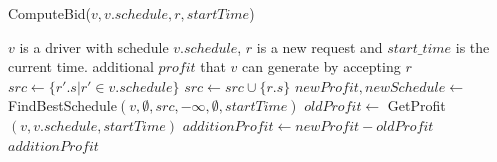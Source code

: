 %


\begin{algorithm}[!h]
	\caption{ComputeBid($v, v.schedule, r, startTime$)}
	\label{algo:comp_bid}
	\begin{algorithmic}[1]
		\REQUIRE $v$ is a driver with schedule $v.schedule$, $r$ is a new request and $start\_time$ is the current time.
		\ENSURE additional $profit$ that $v$ can generate by accepting $r$
		\STATE $src \leftarrow \lbrace r'.s | r' \in v.schedule \rbrace$ 
		\STATE $src \leftarrow src \cup \{r.s\}$
		\STATE \small{$newProfit, newSchedule \leftarrow $FindBestSchedule$(v, \emptyset, src, -\infty, \emptyset,  startTime)$} \label{ln:fbs}
		\STATE $oldProfit\leftarrow $ GetProfit$(v, v.schedule, startTime)$ \label{ln:gps}
		\STATE $additionProfit \leftarrow newProfit - oldProfit$
		\RETURN $additionProfit$
	\end{algorithmic}
\end{algorithm}\vspace{-1mm}

